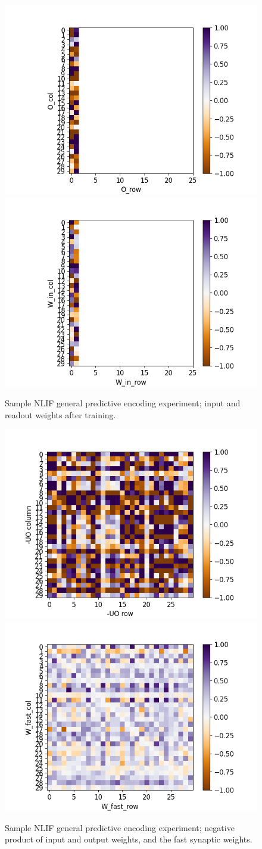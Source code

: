 \documentclass[mphil,deptreport,ianc]{infthesis} %
\begin{document}
\begin{figure}[!h]
    \centering
    \includegraphics[width=0.49\columnwidth]{figures/Supplementary/gating/NLIF/General/01-04_16-42-32-911/test_heatmap_2_O_T.png}
    \includegraphics[width=0.49\columnwidth]{figures/Supplementary/gating/NLIF/General/01-04_16-42-32-911/test_heatmap_2_W_in.png}
    \caption{Sample NLIF general predictive encoding experiment; input and readout weights after training.}
    \label{fig:NLIF_GPE_1_O_W_in}
\end{figure}

\begin{figure}[!h]
    \centering
    \includegraphics[width=0.49\columnwidth]{figures/Supplementary/gating/NLIF/General/01-04_16-42-32-911/test_heatmap_compare_minUO.png}
    \includegraphics[width=0.49\columnwidth]{figures/Supplementary/gating/NLIF/General/01-04_16-42-32-911/test_heatmap_compare_W_fast.png}
    \caption{Sample NLIF general predictive encoding experiment; negative product of input and output weights, and the fast synaptic weights.}
    \label{fig:NLIF_GPE_1_neg_UO_W_fast}
\end{figure}
\end{document}
